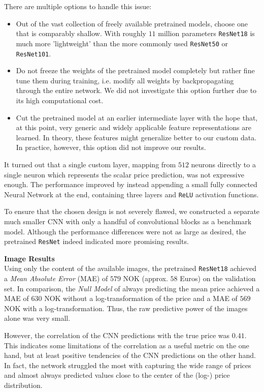 There are multiple options to handle this issue:
\begin{itemize}
  \item Out of the vast collection of freely available pretrained models, choose one that is comparably shallow.
        With roughly $11$ million parameters \texttt{ResNet18} is much more 'lightweight' than the more commonly used \texttt{ResNet50} or \texttt{ResNet101}.
  \item Do not freeze the weights of the pretrained model completely but rather fine tune them during training, i.e. modify all weights by backpropagating through the entire network.
        We did not investigate this option further due to its high computational cost.
  \item Cut the pretrained model at an earlier intermediate layer with the hope that, at this point, very generic and widely applicable feature representations are learned.
        In theory, these features might generalize better to our custom data.
        In practice, however, this option did not improve our results.
\end{itemize}

It turned out that a single custom layer, mapping from $512$ neurons directly to a single neuron which represents the scalar price prediction, was not expressive enough.
The performance improved by instead appending a small fully connected Neural Network at the end, containing three layers and \texttt{ReLU} activation functions.

To ensure that the chosen design is not severely flawed, we constructed a separate much smaller CNN with only a handful of convolutional blocks as a benchmark model.
Although the performance differences were not as large as desired, the pretrained \texttt{ResNet} indeed indicated more promising results.


\textbf{Image Results} \\
Using only the content of the available images, the pretrained \texttt{ResNet18} achieved a \emph{Mean Absolute Error} (MAE) of $579$ NOK (approx. $58$ Euros) on the validation set.
In comparison, the \emph{Null Model} of always predicting the mean price achieved a MAE of $630$ NOK without a log-transformation of the price and a MAE of $569$ NOK with a log-transformation.
Thus, the raw predictive power of the images alone was very small.

However, the correlation of the CNN predictions with the true price was $0.41$.
This indicates some limitations of the correlation as a useful metric on the one hand, but at least positive tendencies of the CNN predictions on the other hand.
In fact, the network struggled the most with capturing the wide range of prices and almost always predicted values close to the center of the (log-) price distribution.

